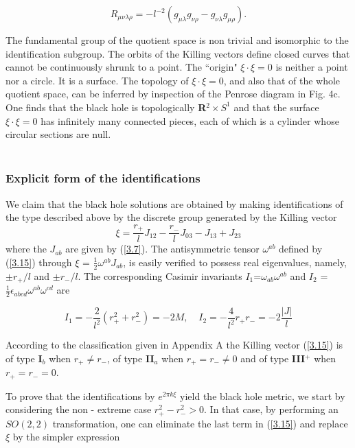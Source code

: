 \documentclass[12pt]{article}
\newcounter{c1} \newcounter{c2}
\newcommand{\bb}{\begin{equation}}
\newcommand{\ee}{\end{equation}}
\begin{document}
\bb
R_{\mu \nu \lambda \rho} = -l^{-2} (g_{\mu \lambda} g_{\nu \rho}
- g_{\nu \lambda} g_{\mu \rho}).
\ee

The fundamental group of the quotient space is non trivial and
isomorphic to the identification subgroup.  The orbits of the
Killing vectors define closed curves that cannot be continuously
shrunk to a point. The  ``origin"  $\xi \cdot \xi=0$ is neither a
point nor a circle. It is a surface. The topology of $\xi \cdot
\xi =0$, and also that of the whole quotient space, can be
inferred by inspection of the Penrose diagram in Fig. 4c.  One
finds that the black hole is topologically {\bf R}$^2 \times
S^1$ and that the surface $\xi \cdot \xi=0$ has infinitely many
connected pieces, each of which is a cylinder whose circular
sections are null.  \\
\\

\subsubsection{Explicit form of the identifications}
%
We claim that the black hole solutions are obtained by making
identifications of the type described above by the discrete
group generated by the Killing vector
\\
\bb
\xi = \frac{r_{+}}{l}J_{12} - \frac{r_{-}}{l}J_{03} - J_{13} + J_{23}
\label{3.15}
\ee
%
where the $J_{ab}$ are given by (\ref{3.7}). The antisymmetric
tensor $\omega^{ab}$ defined by (\ref{3.15}) through $\xi$ =
$\frac{1}{2} \omega^{ab} J_{ab}$,  is easily verified to possess
real eigenvalues, namely, $ \pm r_{+}/l$ and $\pm r_{-}/l$. The
corresponding Casimir invariants $I_1 $=$ \omega_{a b} \omega^{a
b}$ and $I_2$ = $\frac{1}{2}\epsilon _{a b c d} \omega^{a b}
\omega^{cd}$ are

\bb
I_1 = -\frac{2}{l^2}(r_{+}^2 + r_{-}^2)= -2M,\:\;\;\;
I_2 = -\frac{4}{l^2} r_{+} r_{-} = -2\frac{|J|}{l}
\label{3.16}
\ee

According to the classification given in Appendix A the Killing
vector (\ref{3.15}) is of type {\bf I}$_b$ when $r_+\neq r_-$,
of type {\bf II}$_a$ when $r_+ =r_- \not= 0$ and of type {\bf III}$^{+}$ when
 $r_{+} = r_{-}=0 $.

To prove that the identifications by $e^{2\pi k\xi}$ yield the
black hole metric, we start by considering the non - extreme
case $r_{+}^2 - r_{-}^2 > 0$. In that case, by performing an
$SO(2,2)$ transformation, one can eliminate the last term in
(\ref{3.15}) and replace $\xi$ by the simpler expression
\end{document}
